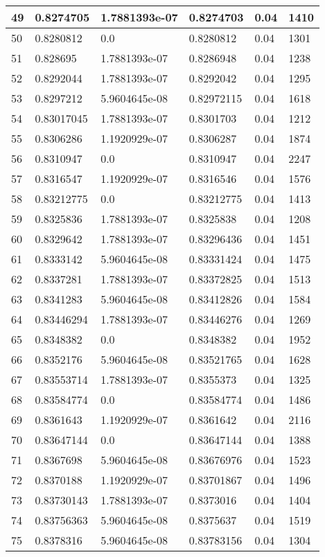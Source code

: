 \begin{longtable}{|l|l|l|l|l|l|}
49 & 0.8274705 & 1.7881393e-07 & 0.8274703 & 0.04 & 1410 \\ \hline 
50 & 0.8280812 & 0.0 & 0.8280812 & 0.04 & 1301 \\ \hline 
51 & 0.828695 & 1.7881393e-07 & 0.8286948 & 0.04 & 1238 \\ \hline 
52 & 0.8292044 & 1.7881393e-07 & 0.8292042 & 0.04 & 1295 \\ \hline 
53 & 0.8297212 & 5.9604645e-08 & 0.82972115 & 0.04 & 1618 \\ \hline 
54 & 0.83017045 & 1.7881393e-07 & 0.8301703 & 0.04 & 1212 \\ \hline 
55 & 0.8306286 & 1.1920929e-07 & 0.8306287 & 0.04 & 1874 \\ \hline 
56 & 0.8310947 & 0.0 & 0.8310947 & 0.04 & 2247 \\ \hline 
57 & 0.8316547 & 1.1920929e-07 & 0.8316546 & 0.04 & 1576 \\ \hline 
58 & 0.83212775 & 0.0 & 0.83212775 & 0.04 & 1413 \\ \hline 
59 & 0.8325836 & 1.7881393e-07 & 0.8325838 & 0.04 & 1208 \\ \hline 
60 & 0.8329642 & 1.7881393e-07 & 0.83296436 & 0.04 & 1451 \\ \hline 
61 & 0.8333142 & 5.9604645e-08 & 0.83331424 & 0.04 & 1475 \\ \hline 
62 & 0.8337281 & 1.7881393e-07 & 0.83372825 & 0.04 & 1513 \\ \hline 
63 & 0.8341283 & 5.9604645e-08 & 0.83412826 & 0.04 & 1584 \\ \hline 
64 & 0.83446294 & 1.7881393e-07 & 0.83446276 & 0.04 & 1269 \\ \hline 
65 & 0.8348382 & 0.0 & 0.8348382 & 0.04 & 1952 \\ \hline 
66 & 0.8352176 & 5.9604645e-08 & 0.83521765 & 0.04 & 1628 \\ \hline 
67 & 0.83553714 & 1.7881393e-07 & 0.8355373 & 0.04 & 1325 \\ \hline 
68 & 0.83584774 & 0.0 & 0.83584774 & 0.04 & 1486 \\ \hline 
69 & 0.8361643 & 1.1920929e-07 & 0.8361642 & 0.04 & 2116 \\ \hline 
70 & 0.83647144 & 0.0 & 0.83647144 & 0.04 & 1388 \\ \hline 
71 & 0.8367698 & 5.9604645e-08 & 0.83676976 & 0.04 & 1523 \\ \hline 
72 & 0.8370188 & 1.1920929e-07 & 0.83701867 & 0.04 & 1496 \\ \hline 
73 & 0.83730143 & 1.7881393e-07 & 0.8373016 & 0.04 & 1404 \\ \hline 
74 & 0.83756363 & 5.9604645e-08 & 0.8375637 & 0.04 & 1519 \\ \hline 
75 & 0.8378316 & 5.9604645e-08 & 0.83783156 & 0.04 & 1304 \\ \hline 
\end{longtable}